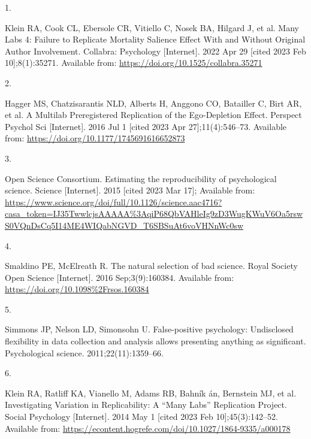 \documentclass[
  english,
  a4paper,
]{article}
\newlength{\cslhangindent}
\newlength{\csllabelwidth}
\newlength{\cslentryspacingunit} %
\newenvironment{CSLReferences}[2] %
 {%
  \setlength{\parindent}{0pt}
  \ifodd #1
  \let\oldpar\par
  \def\par{\hangindent=\cslhangindent\oldpar}
  \fi
  \setlength{\parskip}{#2\cslentryspacingunit}
 }%
 {}
\newcommand{\CSLLeftMargin}[1]{\parbox[t]{\csllabelwidth}{#1}}
\newcommand{\CSLRightInline}[1]{\parbox[t]{\linewidth - \csllabelwidth}{#1}\break}
\begin{document}
\hypertarget{refs}{}
\begin{CSLReferences}{0}{0}
\leavevmode{}%
\CSLLeftMargin{1. }%
\CSLRightInline{Klein RA, Cook CL, Ebersole CR, Vitiello C, Nosek BA, Hilgard J, et al. Many {Labs} 4: {Failure} to {Replicate Mortality Salience Effect With} and {Without Original Author Involvement}. Collabra: Psychology {[}Internet{]}. 2022 Apr 29 {[}cited 2023 Feb 10{]};8(1):35271. Available from: \url{https://doi.org/10.1525/collabra.35271}}

\leavevmode{}%
\CSLLeftMargin{2. }%
\CSLRightInline{Hagger MS, Chatzisarantis NLD, Alberts H, Anggono CO, Batailler C, Birt AR, et al. A {Multilab Preregistered Replication} of the {Ego-Depletion Effect}. Perspect Psychol Sci {[}Internet{]}. 2016 Jul 1 {[}cited 2023 Apr 27{]};11(4):546--73. Available from: \url{https://doi.org/10.1177/1745691616652873}}

\leavevmode{}%
\CSLLeftMargin{3. }%
\CSLRightInline{Open Science Consortium. Estimating the reproducibility of psychological science. Science {[}Internet{]}. 2015 {[}cited 2023 Mar 17{]}; Available from: \url{https://www.science.org/doi/full/10.1126/science.aac4716?casa_token=IJ35TwwlcjsAAAAA\%3AqiP68QbVAHleIg9zD3WugKWuV6Oa5rswS0VQnDsCq5I14ME4WIQabNGVD_T6SBSuAt6voVHNnWc0sw}}

\leavevmode{}%
\CSLLeftMargin{4. }%
\CSLRightInline{Smaldino PE, McElreath R. The natural selection of bad science. Royal Society Open Science {[}Internet{]}. 2016 Sep;3(9):160384. Available from: \url{https://doi.org/10.1098\%2Frsos.160384}}

\leavevmode{}%
\CSLLeftMargin{5. }%
\CSLRightInline{Simmons JP, Nelson LD, Simonsohn U. False-positive psychology: Undisclosed flexibility in data collection and analysis allows presenting anything as significant. Psychological science. 2011;22(11):1359--66. }

\leavevmode{}%
\CSLLeftMargin{6. }%
\CSLRightInline{Klein RA, Ratliff KA, Vianello M, Adams RB, Bahník án, Bernstein MJ, et al. Investigating {Variation} in {Replicability}: {A} {``{Many Labs}''} {Replication Project}. Social Psychology {[}Internet{]}. 2014 May 1 {[}cited 2023 Feb 10{]};45(3):142--52. Available from: \url{https://econtent.hogrefe.com/doi/10.1027/1864-9335/a000178}}


\end{CSLReferences}
\end{document}
